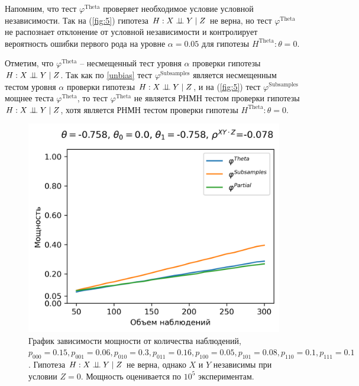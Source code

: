 Напомним, что тест 
$\varphi^{\text{Theta}}$ проверяет необходимое условие условной
независимости. Так на (\autoref{fig:5}) гипотеза 
$H: X \perp\!\!\!\perp Y \mid Z$ не верна, 
но тест $\varphi^{\text{Theta}}$
не распознает отклонение от условной независимости и контролирует вероятность ошибки первого рода
на уровне $\alpha=0.05$ для гипотезы $H^{\text{Theta}}: \theta=0$.

Отметим, что $\varphi^{\text{Theta}}$ -- несмещенный тест уровня
$\alpha$ проверки гипотезы $H: X \perp\!\!\!\perp Y \mid Z$.
Так как по \autoref{unbias} тест $\varphi^{\text{Subsamples}}$
является несмещенным тестом уровня $\alpha$ проверки гипотезы $H: X \perp\!\!\!\perp Y \mid Z$, и 
на (\autoref{fig:5})
тест $\varphi^{\text{Subsamples}}$ мощнее теста $\varphi^{\text{Theta}}$,
то тест $\varphi^{\text{Theta}}$ не является РНМН тестом проверки 
гипотезы $H: X \perp\!\!\!\perp Y \mid Z$, хотя является РНМН тестом
проверки гипотезы $H^{\text{Theta}}: \theta=0$.

\begin{figure}[H]
    \centering
    \includegraphics[scale=0.55]{images/graph3.png}
    \caption{График зависимости мощности от количества наблюдений,
    $p_{000}=0.15, p_{001}=0.06, 
    p_{010}=0.3, p_{011}=0.16,
    p_{100}=0.05, p_{101}=0.08, p_{110}=0.1, p_{111}=0.1$. 
    Гипотеза $H: X \perp\!\!\!\perp Y \mid Z$ не верна, однако $X$ и $Y$ независимы
    при условии $Z=0$. 
    Мощность оценивается по $10^5$ экспериментам.}\label{fig:3}
\end{figure}

